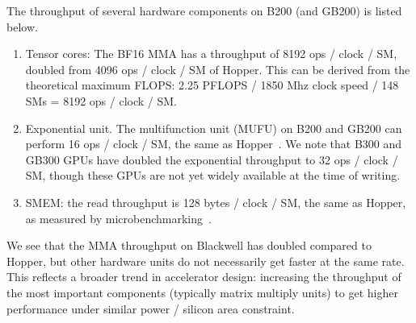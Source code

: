The throughput of several hardware components on B200 (and GB200) is listed below.
\begin{enumerate}[itemsep=0pt,topsep=0pt,leftmargin=*]
  \item Tensor cores: The BF16 MMA has a throughput of 8192 ops / clock / SM, doubled from 4096 ops / clock / SM of Hopper. This can be derived from the theoretical maximum FLOPS: 2.25 PFLOPS / 1850 Mhz clock speed / 148 SMs = 8192 ops / clock / SM.
  \item Exponential unit. The multifunction unit (MUFU) on B200 and GB200 can perform 16 ops / clock / SM, the same as Hopper~\citep{cuda}. We note that B300 and GB300 GPUs have doubled the exponential throughput to 32 ops / clock / SM, though these GPUs are not yet widely available at the time of writing.
  \item SMEM: the read throughput is 128 bytes / clock / SM, the same as Hopper, as measured by microbenchmarking~\citep{luo2025dissecting}.
\end{enumerate}
We see that the MMA throughput on Blackwell has doubled compared to Hopper, but other hardware units do not necessarily get faster at the same rate. This reflects a broader trend in accelerator design: increasing the throughput of the most important components (typically matrix multiply units) to get higher performance under similar power / silicon area constraint.
